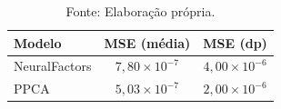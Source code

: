 \begin{table}[H]
\centering
\caption{Erro Quadrático Médio da Previsão de Covariância — Teste}
\label{tab:cov}
\begin{tabular}{lcc}
\hline
\textbf{Modelo} & \textbf{MSE (média)} & \textbf{MSE (dp)} \\
\hline
NeuralFactors & $7{,}80 \times 10^{-7}$ & $4{,}00 \times 10^{-6}$ \\
PPCA          & $5{,}03 \times 10^{-7}$ & $2{,}00 \times 10^{-6}$ \\
\hline
\end{tabular}
\caption*{Fonte: Elaboração própria.}
\end{table}
